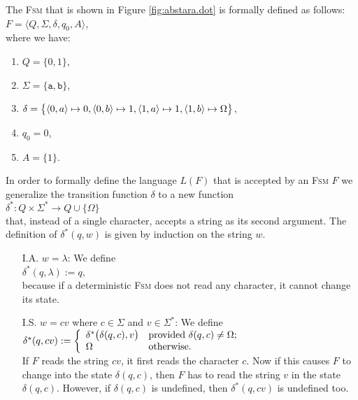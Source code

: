 \exampleEng
The \textsc{Fsm} that is shown in Figure  \ref{fig:abstara.dot} is formally defined as follows:
\\[0.2cm]
\hspace*{1.3cm}
$F = \langle Q, \Sigma, \delta, q_0, A \rangle$,
\\[0.2cm]
where we have:
\begin{enumerate}
\item $Q = \{ 0, 1 \}$,
\item $\Sigma = \{ \texttt{a}, \texttt{b} \}$,
\item $\delta = \bigl\{ 
                        \pair(0,a) \mapsto 0, 
                        \pair(0,b) \mapsto 1, 
                        \pair(1,a) \mapsto 1, 
                        \pair(1,b) \mapsto \Omega 
                \bigr\}$,
\item $q_0 = 0$,
\item $A = \{ 1 \}$.
\end{enumerate}
In order to formally define the language $L(F)$ that is accepted by an \textsc{Fsm} $F$
we generalize the transition function $\delta$ to a new function
\\[0.2cm]
\hspace*{1.3cm}
$\delta^*: Q \times \Sigma^* \rightarrow Q \cup \{ \Omega \}$
\\[0.2cm]
that, instead of a single character, accepts a string as its second argument.  The definition of
$\delta^*(q, w)$ is given by induction on the string $w$.
\begin{enumerate}
\item[I.A.] $w = \lambda$:  We define
            \\[0.2cm]
            \hspace*{1.3cm}
            $\delta^*(q, \lambda) := q$,
            \\[0.2cm]
            because if a deterministic \textsc{Fsm} does not read any character, it cannot change its state. 
\item[I.S.] $w = cv$ where $c \in \Sigma$ and $v  \in \Sigma^*$:  We define
            \\[0.2cm]
            \hspace*{1.3cm}
            $\delta^*(q, cv) := \left\{
            \begin{array}[c]{ll}              
            \delta^*\bigl(\delta(q,c),v\bigr) & \mbox{provided $\delta(q,c) \not= \Omega$;} \\
            \Omega                            & \mbox{otherwise}.
            \end{array}
            \right.
            $
            \\[0.2cm]
            If $F$ reads the string  $cv$, it first reads the character $c$.  Now if this causes  $F$
            to change into the state $\delta(q,c)$, then $F$ has to read the string $v$ in the state
            $\delta(q,c)$.  However, 
            if  $\delta(q,c)$ is undefined, then  $\delta^*(q,cv)$ is undefined too.
\end{enumerate}

